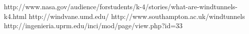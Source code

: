 \begin{thebibliography}{99}
		http://www.nasa.gov/audience/forstudents/k-4/stories/what-are-windtunnels-k4.html
		http://windvane.umd.edu/
		http://www.southampton.ac.uk/windtunnels
		http://ingenieria.uprm.edu/inci/mod/page/view.php?id=33
\end{thebibliography}